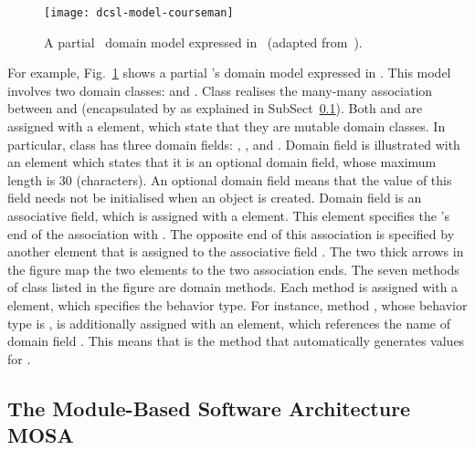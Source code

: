 %
\begin{figure}[ht]
	\centering
	\texttt{[image: dcsl-model-courseman]}
	\caption{A partial \courseman~domain model expressed in \dcsl~(adapted from~\cite{le_domain_2018}).}
	\label{fig:dcsl_courseman}
\end{figure}

For example, Fig.~\ref{fig:dcsl_courseman} shows a partial \courseman's domain model expressed in \dcsl. This model involves two domain classes:  and . Class  realises the many-many association between  and  (encapsulated by  as explained in SubSect~\ref{sect:bg-arch}). Both  and  are assigned with a  element, which state that they are mutable domain classes. In particular, class  has three domain fields: , , and . Domain field  is illustrated with an  element which states that it is an optional domain field, whose maximum length is 30 (characters). An optional domain field means that the value of this field needs not be initialised when an object is created. Domain field  is an associative field, which is assigned with a  element. This element specifies the 's end of the association with . The opposite end of this association is specified by another  element that is assigned to the associative field . The two thick arrows in the figure map the two  elements to the two association ends. 
%
The seven methods of class  listed in the figure are domain methods. Each method is assigned with a  element, which specifies the behavior type. For instance, method , whose behavior type is , is additionally assigned with an  element, which references the name of domain field . This means that  is the method that automatically generates values for .

\subsection{The Module-Based Software Architecture MOSA}
\label{sect:bg-arch} %

